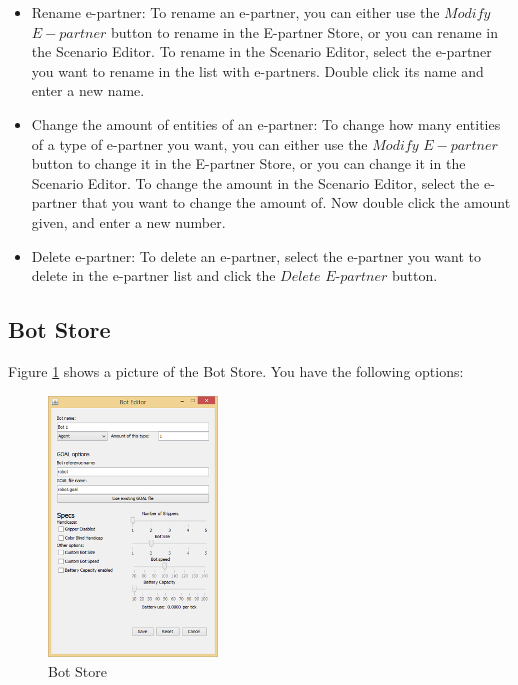 \begin{itemize}
\item{Rename e-partner}:
To rename an e-partner, you can either use the $Modify$ $E-partner$ button to rename in the E-partner Store, or you can rename in the Scenario Editor. To rename in the Scenario Editor, select the e-partner you want to rename in the list with e-partners. Double click its name and enter a new name.

\item{Change the amount of entities of an e-partner}:
To change how many entities of a type of e-partner you want, you can either use the $Modify$ $E-partner$ button to change it in the E-partner Store, or you can change it in the Scenario Editor. To change the amount in the Scenario Editor, select the e-partner that you want to change the amount of. Now double click the amount given, and enter a new number.

\item{Delete e-partner}:
To delete an e-partner, select the e-partner you want to delete in the e-partner list and click the $Delete$ $E$-$partner$ button.

\end{itemize}


\subsection{Bot Store}
Figure \ref{fig:BotStore} shows a picture of the Bot Store. You have the following options:

\begin{figure}
\begin{center}
\includegraphics[width=0.4\textwidth]{ScenarioEditor/bs.png}
\end{center}
\caption{Bot Store}
\label{fig:BotStore}
\end{figure}

